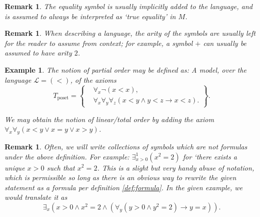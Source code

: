 \documentclass{article}
\newtheorem{remark}[theorem]{Remark}
\newtheorem{example}[theorem]{Example}
\theoremstyle{nonumberplain}
\newcommand{\Lang}{\mathcal{L}}
\begin{document}
\begin{remark}
The equality symbol is usually implicitly added to the language, and is assumed to always be interpreted as `true equality' in $M$.
\end{remark}

\begin{remark}
When describing a language, the arity of the symbols are usually left for the reader to assume from context; for example, a symbol $+$ can usually be assumed to have arity $2$.
\end{remark}

\begin{example}
The notion of partial order may be defined as: A model, over the language $\Lang = (<)$, of the axioms
\begin{equation}
T_{\text{poset}} = \left\{
\begin{aligned}
&\forall_x \neg(x<x),\\
&\forall_x \forall_y \forall_z (x < y \land y < z \rightarrow x<z).
\end{aligned}\right\}.
\end{equation}

We may obtain the notion of linear/total order by adding the axiom $\forall_x \forall_y (x<y \lor x=y \lor x>y)$.
\end{example}

\begin{remark}
Often, we will write collections of symbols which are not formulas under the above definition. For example: $\exists^1_{x>0} (x^2 = 2)$ for `there exists a unique $x>0$ such that $x^2 = 2$. This is a slight but very handy abuse of notation, which is permissible so long as there is an obvious way to rewrite the given statement as a formula per definition \ref{def:formula}. In the given example, we would translate it as 
\begin{equation}
\exists_x (x > 0 \land x^2 = 2 \land (\forall_y (y > 0 \land y^2 = 2) \rightarrow y=x)).
\end{equation}
\end{remark}



\end{document}
